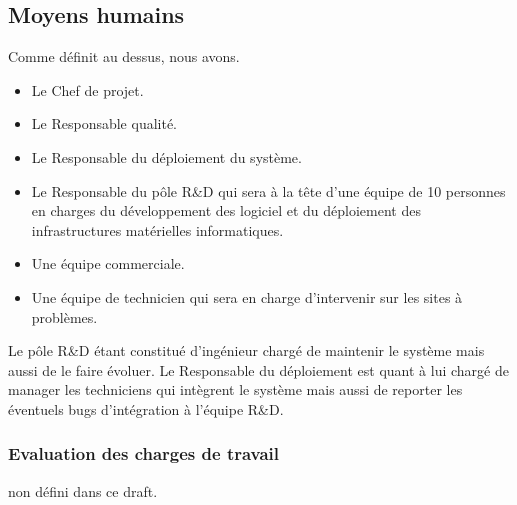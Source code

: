 \subsection{Moyens humains}
Comme définit au dessus, nous avons.
\begin{itemize}
\item Le Chef de projet.
\item Le Responsable qualité.
\item Le Responsable du déploiement du système.
\item Le Responsable du pôle R\&D qui sera à la tête d'une équipe de 10 personnes en charges du développement des logiciel et du déploiement des infrastructures matérielles informatiques.
\item Une équipe commerciale.
\item Une équipe de technicien qui sera en charge d'intervenir sur les sites à problèmes.
\end{itemize}
Le pôle R\&D étant constitué d'ingénieur chargé de maintenir le système mais aussi de le faire évoluer.
Le Responsable du déploiement est quant à lui chargé de manager les techniciens qui intègrent le système mais aussi de reporter les éventuels bugs d'intégration à l'équipe R\&D.
\subsubsection{Evaluation des charges de travail}
non défini dans ce draft.






